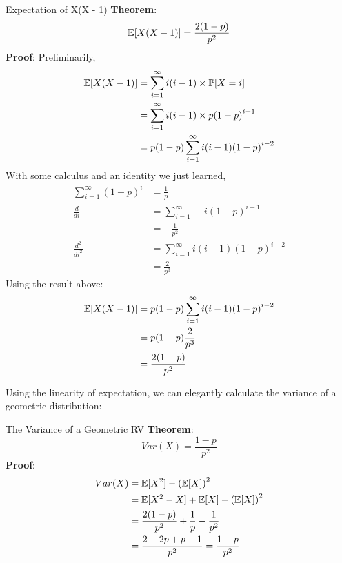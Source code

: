 \begin{ln-theorem}{Expectation of X(X - 1)}{}
    \textbf{Theorem}:
    \[\mathbb{E}[X(X - 1)] = \frac{2(1 - p)}{p^2}\]
    \tcblower
    \textbf{Proof}:
    Preliminarily,
    \begin{align*}
        \mathbb{E}[X(X - 1)]
        &= \sum_{i = 1}^\infty i(i - 1) \times \mathbb{P}[X = i] \\
        &= \sum_{i = 1}^\infty i(i - 1) \times p{(1 - p)}^{i - 1} \\
        &= p(1 - p) \sum_{i = 1}^\infty i(i - 1) {(1 - p)}^{i - 2}
    \end{align*}
    With some calculus and an identity we just learned,
    \begin{align*}
        \sum_{i = 1}^\infty {(1 - p)}^i &= \frac{1}{p} \\
        \frac{d}{di} &= \sum_{i = 1}^\infty -i{(1 - p)}^{i - 1} \\
        &= -\frac{1}{p^2} \\
        \frac{d^2}{di^2} &= \sum_{i = 1}^\infty i(i - 1) {(1 - p)}^{i - 2} \\
        &= \frac{2}{p^3}
    \end{align*}
    Using the result above:
    \begin{align*}
        \mathbb{E}[X(X - 1)]
        &= p(1 - p) \sum_{i = 1}^\infty i(i - 1) {(1 - p)}^{i - 2} \\
        &= p(1 - p) \frac{2}{p^3} \\
        &= \frac{2(1 - p)}{p^2}
    \end{align*}
\end{ln-theorem}

Using the linearity of expectation, we can elegantly calculate the variance of a geometric distribution:
\begin{ln-theorem}{The Variance of a Geometric RV}{}
    \textbf{Theorem}:
    \[Var(X) = \frac{1 - p}{p^2}\]
    \tcblower
    \textbf{Proof}:
    \begin{align*}
        Var(X) &= \mathbb{E}[X^2] - {(\mathbb{E}[X])}^2 \\
        &= \mathbb{E}[X^2 - X] + \mathbb{E}[X] - {(\mathbb{E}[X])}^2 \\
        &= \frac{2(1 - p)}{p^2} + \frac{1}{p} - \frac{1}{p^2} \\
        &= \frac{2 - 2p + p - 1}{p^2} = \frac{1 - p}{p^2}
    \end{align*}
\end{ln-theorem}

